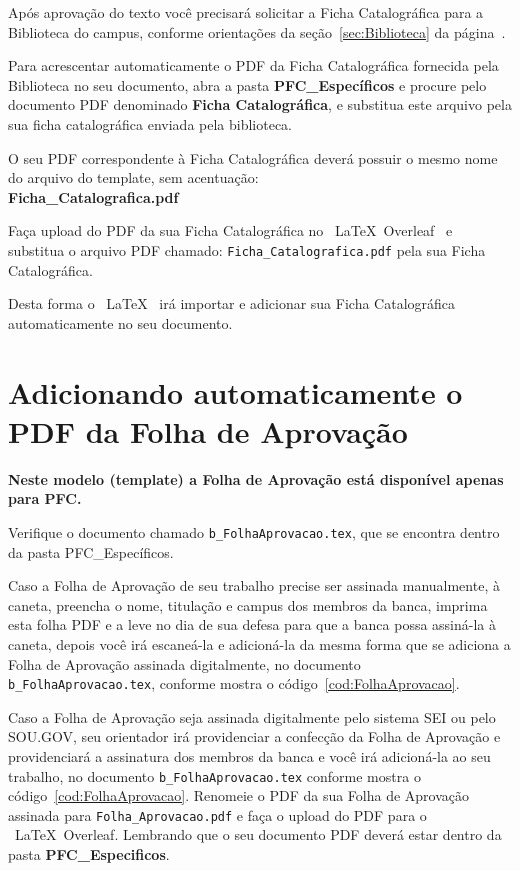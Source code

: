 Após aprovação do texto você precisará solicitar a Ficha Catalográfica para a Biblioteca do campus, conforme orientações da seção~\ref{sec:Biblioteca} da página~\pageref{sec:Biblioteca}.

Para acrescentar automaticamente o PDF da Ficha Catalográfica fornecida pela Biblioteca no seu documento, abra a pasta  {\bf PFC\_Específicos} e procure pelo documento PDF denominado {\bf Ficha Catalográfica}, e substitua este arquivo pela sua ficha catalográfica enviada pela biblioteca.

\begin{CaixaVermelha}
    O seu PDF correspondente à Ficha Catalográfica deverá possuir o mesmo nome do arquivo do template, sem acentuação:\\

    {\bf Ficha\_Catalografica.pdf}
\end{CaixaVermelha}

Faça upload do PDF da sua Ficha Catalográfica no ~\LaTeX~Overleaf~ e substitua o arquivo PDF chamado: \verb|Ficha_Catalografica.pdf| pela sua Ficha Catalográfica.

Desta forma o ~\LaTeX~ irá importar e adicionar sua Ficha Catalográfica automaticamente no seu documento.


\section{Adicionando automaticamente o PDF da Folha de Aprovação}

{\bf Neste modelo (template) a Folha de Aprovação está disponível apenas para PFC.}

Verifique o documento chamado \verb|b_FolhaAprovacao.tex|, que se encontra dentro da pasta PFC\_Específicos. 

Caso a Folha de Aprovação de seu trabalho precise ser assinada manualmente, à caneta, preencha o nome, titulação e campus dos membros da banca, imprima esta folha PDF e a leve no dia de sua defesa para que a banca possa assiná-la à caneta, depois você irá escaneá-la e adicioná-la da mesma forma que se adiciona a Folha de Aprovação assinada digitalmente, no documento \verb|b_FolhaAprovacao.tex|, conforme mostra o código~\ref{cod:FolhaAprovacao}.

Caso a Folha de Aprovação seja assinada digitalmente pelo sistema SEI ou pelo SOU.GOV, seu orientador irá providenciar a confecção da Folha de Aprovação e providenciará a assinatura dos membros da banca e você irá adicioná-la ao seu trabalho, no documento \verb|b_FolhaAprovacao.tex| conforme mostra o código~\ref{cod:FolhaAprovacao}. Renomeie o PDF da sua Folha de Aprovação assinada para \verb|Folha_Aprovacao.pdf| e faça o upload do PDF para o ~\LaTeX~Overleaf. Lembrando que o seu documento PDF deverá estar dentro da pasta {\bf PFC\_Especificos}.

